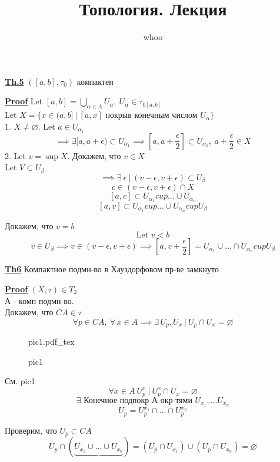 \documentclass[a4paper]{article}
\newcommand{\incfig}[1]{%
\def\svgwidth{\columnwidth}
{#1.pdf_tex}
}
\begin{document}
\title{Топология. Лекция}
\author{whoo}
\maketitle

\begin{tcolorbox}
    \textbf{\underline{Th.5}} $ ([a,b], \tau_0) $ компактен 

    \textbf{\underline{Proof}} Let $ [a,b] = \bigcup_{\alpha \in A} U_{\alpha}, \ 
    U_{\alpha} \in \tau_{0[a,b]}$\\
    Let $ X = \{ x \in (a, b] \ | \ [a,x] \text{ покрыв конечным числом } U_\alpha \} $ \\
    1. $ X \neq \varnothing $. Let $ a \in U_{\alpha_1} $  
    \[
        \implies \exists [a,a+\epsilon) \subset U_{\alpha_1} \implies 
        [a, a + \frac{\epsilon}{2}] \subset U_{\alpha_1}, \ a + \frac{\epsilon}{2} \in X 
    \]
    2. Let $ v = \sup X $. Докажем, что $ v \in X $\\
    Let $ V \subset U_{\beta} $
    \[
        \implies \exists \ \epsilon \ | \ (v - \epsilon, v + \epsilon) \subset
        U_\beta
    \]
    \[
        c \in (v - \epsilon, v + \epsilon) \cap X
    \]
    \[
        [a,c] \subset U_{\alpha_1} cup \dots \cup U_{\alpha_n}
    \]
    \[
        [a,v] \subset U_{\alpha_1} cup \dots \cup U_{\alpha_n} cup U_\beta
    \]

    Докажем, что $ v = b $ 
    \[
        \text{Let } v < b
    \]
    \[
        v \in U_\beta \implies v \in (v - \epsilon, v + \epsilon) \implies
        [a, v + \frac{\epsilon}{2}] = U_{\alpha_1} \cup \dots \cap U_{\alpha_n} cup U_\beta
    \]
\end{tcolorbox}

\begin{tcolorbox}
\textbf{\underline{Th6}} Компактное подмн-во в Хауздорфовом пр-ве замкнуто

\textbf{\underline{Proof}} $ (X, \tau) \in T_2 $\\
А - комп подмн-во.\\
Докажем, что $ CA \in \tau $ 
\[
    \forall p \in CA, \ \forall \, x \in A \implies \exists \, U_p, U_x \ | \ 
    U_p \cap U_x = \varnothing
\]
\end{tcolorbox}

\begin{figure}[!ht]
    \centering
    \incfig{pic1}
    \caption{pic1}
    \label{fig:pic1}
\end{figure}
\begin{tcolorbox}
    См. pic1
\[
    \forall x \in A \ U_p^{x} \ | \ U_{p}^{x} \cap U_x = \varnothing
\]
\[
    \exists \text{ Конечное подпокр А окр-тями }U_{x_1}, \dots U_{x_n}
\]
\[
    U_p = U_p^{x_1} \cap \dots \cap U_{p}^{x_n}
\]

Проверим, что $ U_p \subset CA $ 
\[
    U_p \cap (\underbrace{U_{x_1}\cup \dots \cup U_{x_n}}) = 
    (U_p \cap U_{x_1}) \cup (U_p \cap U_{x_n}) = \varnothing
\]
\end{tcolorbox}
\end{document}
